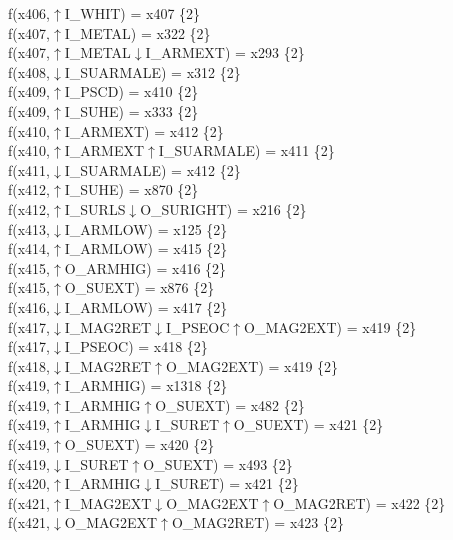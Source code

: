 f(x406,$\uparrow$I\_WHIT) = x407 \{2\} \\  
f(x407,$\uparrow$I\_METAL) = x322 \{2\} \\  
f(x407,$\uparrow$I\_METAL$\downarrow$I\_ARMEXT) = x293 \{2\} \\  
f(x408,$\downarrow$I\_SUARMALE) = x312 \{2\} \\  
f(x409,$\uparrow$I\_PSCD) = x410 \{2\} \\  
f(x409,$\uparrow$I\_SUHE) = x333 \{2\} \\  
f(x410,$\uparrow$I\_ARMEXT) = x412 \{2\} \\  
f(x410,$\uparrow$I\_ARMEXT$\uparrow$I\_SUARMALE) = x411 \{2\} \\  
f(x411,$\downarrow$I\_SUARMALE) = x412 \{2\} \\  
f(x412,$\uparrow$I\_SUHE) = x870 \{2\} \\  
f(x412,$\uparrow$I\_SURLS$\downarrow$O\_SURIGHT) = x216 \{2\} \\  
f(x413,$\downarrow$I\_ARMLOW) = x125 \{2\} \\  
f(x414,$\uparrow$I\_ARMLOW) = x415 \{2\} \\  
f(x415,$\uparrow$O\_ARMHIG) = x416 \{2\} \\  
f(x415,$\uparrow$O\_SUEXT) = x876 \{2\} \\  
f(x416,$\downarrow$I\_ARMLOW) = x417 \{2\} \\  
f(x417,$\downarrow$I\_MAG2RET$\downarrow$I\_PSEOC$\uparrow$O\_MAG2EXT) = x419 \{2\} \\  
f(x417,$\downarrow$I\_PSEOC) = x418 \{2\} \\  
f(x418,$\downarrow$I\_MAG2RET$\uparrow$O\_MAG2EXT) = x419 \{2\} \\  
f(x419,$\uparrow$I\_ARMHIG) = x1318 \{2\} \\  
f(x419,$\uparrow$I\_ARMHIG$\uparrow$O\_SUEXT) = x482 \{2\} \\  
f(x419,$\uparrow$I\_ARMHIG$\downarrow$I\_SURET$\uparrow$O\_SUEXT) = x421 \{2\} \\  
f(x419,$\uparrow$O\_SUEXT) = x420 \{2\} \\  
f(x419,$\downarrow$I\_SURET$\uparrow$O\_SUEXT) = x493 \{2\} \\  
f(x420,$\uparrow$I\_ARMHIG$\downarrow$I\_SURET) = x421 \{2\} \\  
f(x421,$\uparrow$I\_MAG2EXT$\downarrow$O\_MAG2EXT$\uparrow$O\_MAG2RET) = x422 \{2\} \\  
f(x421,$\downarrow$O\_MAG2EXT$\uparrow$O\_MAG2RET) = x423 \{2\} \\  
